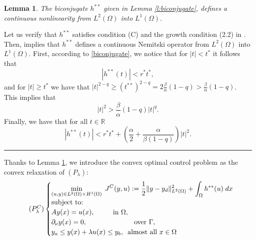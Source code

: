 \documentclass[11pt,a4paper]{amsart}
\newcommand{\kw}{\rule{2mm}{2mm}}
\newcommand{\om}{\Omega}
\renewenvironment{proof}{{Proof.}}{\hfill\kw}
\newtheorem{lemma}{{Lemma}}
\newcommand{\norm}[1]{\lVert #1 \rVert}
\begin{document}

 \begin{lemma}\label{l:h_integrable}
    The biconjugate $h^{**}$ given in Lemma \ref{l:biconjugate}, defines a continuous nonlinearity from $L^2(\Omega)$ into $L^1(\Omega)$.
\end{lemma}
\begin{proof}
    Let us verify that $h^{**}$ satisfies condition (C)  and the growth condition (2.2) in \cite[p.g. 16]{ambrosetti}. Then, \cite[Theorem 2.2]{ambrosetti} implies that $h^{**}$ defines a continuous Nemitski operator from $L^2(\Omega)$ into $L^1(\Omega)$. First, according to  \eqref{biconjugate}, we notice that for $|t|<t^*$ it follows that
    \[
    |h^{**}(t)|<r^*t^*,
    \]
    and for $|t|\ge t^*$ we have that $|t|^{2-q}\ge(t^{**})^{2-q}=2\frac{\beta}{\alpha}(1-q)>\frac{\beta}{\alpha}(1-q)$. This implies that 
    \[
    |t|^{2}>\frac{\beta}{\alpha}(1-q)|t|^q.
    \]
    Finally, we have that for all $t\in \mathbb{R}$ 
    \[
    |h^{**}(t)|<r^*t^*+\left (\frac{\alpha}{2}+\frac{\alpha}{\beta(1-q)}\right)|t|^2.
    \]

\end{proof}  
 
Thanks to  Lemma \ref{l:h_integrable}, we introduce the convex optimal control problem as the convex relaxation of $(P_\lambda)$: 
    \begin{equation}\label{convex}\tag{$P^C_{\lambda}$}
    \begin{cases}
    \displaystyle\min_{(u,y)\in L^2(\om)\times H^1(\Omega)} \; J^C(y,u):=\frac{1}{2}\norm{y-y_d}^2_{L^2(\om)}+\int_{\Omega}h^{**}(u)\; dx\\
    \mbox{subject to:}\\
    Ay(x)=u(x), \phantom{aaaaa} \mbox{in } \om,\\
    \partial_{\nu}y(x)=0, \phantom{aaaaaaaaaaaaa} \mbox{over } \Gamma,\\    
    y_a\le y(x)+\lambda u(x)\le y_b,\phantom{a} \mbox{almost all }x\in \Omega
    \end{cases}
    \end{equation}
    
\end{document}
